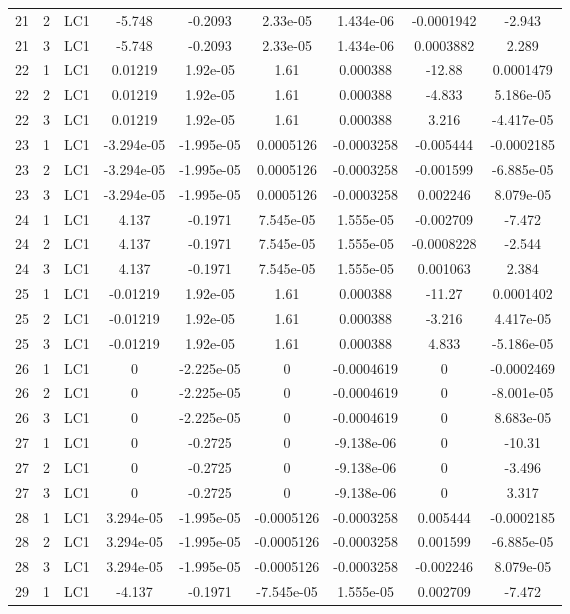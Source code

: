 \documentclass{article}%
\begin{document}
\begin{longtable}{| c c c | c c c c c c |}
21&2&LC1&{-}5.748&{-}0.2093&2.33e{-}05&1.434e{-}06&{-}0.0001942&{-}2.943\\%
21&3&LC1&{-}5.748&{-}0.2093&2.33e{-}05&1.434e{-}06&0.0003882&2.289\\%
22&1&LC1&0.01219&1.92e{-}05&1.61&0.000388&{-}12.88&0.0001479\\%
22&2&LC1&0.01219&1.92e{-}05&1.61&0.000388&{-}4.833&5.186e{-}05\\%
22&3&LC1&0.01219&1.92e{-}05&1.61&0.000388&3.216&{-}4.417e{-}05\\%
23&1&LC1&{-}3.294e{-}05&{-}1.995e{-}05&0.0005126&{-}0.0003258&{-}0.005444&{-}0.0002185\\%
23&2&LC1&{-}3.294e{-}05&{-}1.995e{-}05&0.0005126&{-}0.0003258&{-}0.001599&{-}6.885e{-}05\\%
23&3&LC1&{-}3.294e{-}05&{-}1.995e{-}05&0.0005126&{-}0.0003258&0.002246&8.079e{-}05\\%
24&1&LC1&4.137&{-}0.1971&7.545e{-}05&1.555e{-}05&{-}0.002709&{-}7.472\\%
24&2&LC1&4.137&{-}0.1971&7.545e{-}05&1.555e{-}05&{-}0.0008228&{-}2.544\\%
24&3&LC1&4.137&{-}0.1971&7.545e{-}05&1.555e{-}05&0.001063&2.384\\%
25&1&LC1&{-}0.01219&1.92e{-}05&1.61&0.000388&{-}11.27&0.0001402\\%
25&2&LC1&{-}0.01219&1.92e{-}05&1.61&0.000388&{-}3.216&4.417e{-}05\\%
25&3&LC1&{-}0.01219&1.92e{-}05&1.61&0.000388&4.833&{-}5.186e{-}05\\%
26&1&LC1&0&{-}2.225e{-}05&0&{-}0.0004619&0&{-}0.0002469\\%
26&2&LC1&0&{-}2.225e{-}05&0&{-}0.0004619&0&{-}8.001e{-}05\\%
26&3&LC1&0&{-}2.225e{-}05&0&{-}0.0004619&0&8.683e{-}05\\%
27&1&LC1&0&{-}0.2725&0&{-}9.138e{-}06&0&{-}10.31\\%
27&2&LC1&0&{-}0.2725&0&{-}9.138e{-}06&0&{-}3.496\\%
27&3&LC1&0&{-}0.2725&0&{-}9.138e{-}06&0&3.317\\%
28&1&LC1&3.294e{-}05&{-}1.995e{-}05&{-}0.0005126&{-}0.0003258&0.005444&{-}0.0002185\\%
28&2&LC1&3.294e{-}05&{-}1.995e{-}05&{-}0.0005126&{-}0.0003258&0.001599&{-}6.885e{-}05\\%
28&3&LC1&3.294e{-}05&{-}1.995e{-}05&{-}0.0005126&{-}0.0003258&{-}0.002246&8.079e{-}05\\%
29&1&LC1&{-}4.137&{-}0.1971&{-}7.545e{-}05&1.555e{-}05&0.002709&{-}7.472\\%

\end{longtable}
\end{document}
